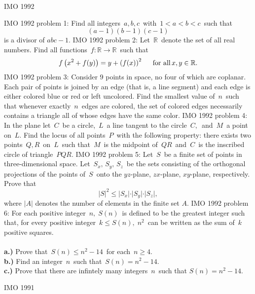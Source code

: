 IMO 1992 

IMO 1992 problem 1:  Find all integers $\,a,b,c\,$ with $\,1<a<b<c\,$ such that
\[ (a-1)(b-1)(c-1) \]
is a divisor of $abc-1.$ 
IMO 1992 problem 2:  Let $\,{\mathbb{R}}\,$ denote the set of all real numbers. Find all functions $\,f: {\mathbb{R}}\rightarrow {\mathbb{R}}\,$ such that
\[
f\left( x^2+f(y)\right) =y+\left( f(x)\right) ^2\hspace{0.2in}\text{for all}\,x,y\in \mathbb{R}.
\] 
IMO 1992 problem 3:  Consider $9$ points in space, no four of which are coplanar. Each pair of points is joined by an edge (that is, a line segment) and each edge is either colored blue or red or left uncolored. Find the smallest value of  $\,n\,$ such that whenever exactly $\,n\,$ edges are colored, the set of colored edges necessarily contains a triangle all of whose edges have the same color. 
IMO 1992 problem 4:  In the plane let $\,C\,$ be a circle, $\,L\,$ a line tangent to the circle $\,C,\,$ and $\,M\,$ a point on $\,L$. Find the locus of all points $\,P\,$ with the following property: there exists two points $\,Q,R\,$ on $\,L\,$ such that $\,M\,$ is the midpoint of $\,QR\,$ and $\,C\,$ is the inscribed circle of triangle $\,PQR$.
IMO 1992 problem 5: Let $\,S\,$ be a finite set of points in three-dimensional space. Let $\,S_{x},\,S_{y},\,S_{z}\,$ be the sets consisting of the orthogonal projections of the points of $\,S\,$ onto the $yz$-plane, $zx$-plane, $xy$-plane, respectively. Prove that \[ \vert S\vert^{2}\leq \vert S_{x} \vert \cdot \vert S_{y} \vert \cdot \vert S_{z} \vert, \] where $\vert A \vert$ denotes the number of elements in the finite set $A$. 
IMO 1992 problem 6:  For each positive integer $\,n,\;S(n)\,$ is defined to be the greatest integer such that, for every positive integer $\,k\leq S(n),\;n^2\,$ can be written as the sum of $\,k\,$ positive squares. \\\\
\textbf{a.)} Prove that $\,S(n)\leq n^2-14\,$ for each $\,n\geq 4$. \\
\textbf{b.)} Find an integer $\,n\,$ such that $\,S(n)=n^2-14$. \\
\textbf{c.)} Prove that there are infintely many integers $\,n\,$ such that $S(n)=n^2-14.$ 

IMO 1991 

